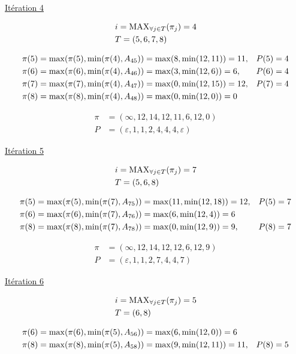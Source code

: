 \documentclass{article}
\begin{document}
\underline{Itération 4}

\begin{align*}
  &i = \operatorname{MAX}_{\forall j \in T}(\pi_j) = 4\\
  &T = (5,6,7,8)
\end{align*}

\begin{align*}
  &\pi(5) = \operatorname{max}(\pi(5), \operatorname{min}(\pi(4), A_{45})) = \operatorname{max}(8, \operatorname{min}(12,11)) = 11, &P(5) = 4\\
  &\pi(6) = \operatorname{max}(\pi(6), \operatorname{min}(\pi(4), A_{46})) = \operatorname{max}(3, \operatorname{min}(12,6)) = 6, &P(6) = 4\\
  &\pi(7) = \operatorname{max}(\pi(7), \operatorname{min}(\pi(4), A_{47})) = \operatorname{max}(0, \operatorname{min}(12,15)) = 12, &P(7) = 4\\
  &\pi(8) = \operatorname{max}(\pi(8), \operatorname{min}(\pi(4), A_{48})) = \operatorname{max}(0, \operatorname{min}(12,0)) = 0
\end{align*}

\begin{align*}
  \pi &= (\infty,12,14,12,11,6,12,0)\\
  P &= (\varepsilon, 1, 1, 2, 4, 4, 4, \varepsilon)
\end{align*}

\underline{Itération 5}

\begin{align*}
  &i = \operatorname{MAX}_{\forall j \in T}(\pi_j) = 7\\
  &T = (5,6,8)
\end{align*}

\begin{align*}
  &\pi(5) = \operatorname{max}(\pi(5), \operatorname{min}(\pi(7), A_{75})) = \operatorname{max}(11, \operatorname{min}(12,18)) = 12, &P(5) = 7\\
  &\pi(6) = \operatorname{max}(\pi(6), \operatorname{min}(\pi(7), A_{76})) = \operatorname{max}(6, \operatorname{min}(12,4)) = 6\\
  &\pi(8) = \operatorname{max}(\pi(8), \operatorname{min}(\pi(7), A_{78})) = \operatorname{max}(0, \operatorname{min}(12,9)) = 9, &P(8) = 7
\end{align*}

\begin{align*}
  \pi &= (\infty,12,14,12,12,6,12,9)\\
  P &= (\varepsilon, 1, 1, 2, 7, 4, 4, 7)
\end{align*}

\underline{Itération 6}

\begin{align*}
  &i = \operatorname{MAX}_{\forall j \in T}(\pi_j) = 5\\
  &T = (6,8)
\end{align*}

\begin{align*}
  &\pi(6) = \operatorname{max}(\pi(6), \operatorname{min}(\pi(5), A_{56})) = \operatorname{max}(6, \operatorname{min}(12,0)) = 6\\
  &\pi(8) = \operatorname{max}(\pi(8), \operatorname{min}(\pi(5), A_{58})) = \operatorname{max}(9, \operatorname{min}(12,11)) = 11, &P(8) = 5
\end{align*}
\end{document}
